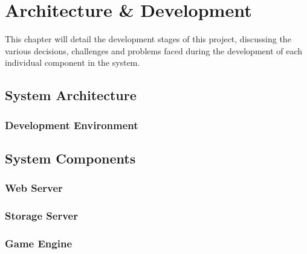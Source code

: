 \chapter{Architecture \& Development}
This chapter will detail the development stages of this project, discussing the various decisions, challenges and problems faced during the development of each individual component in the system.

\section{System Architecture}
	\subsection{Development Environment}


\section{System Components}
% 
	\subsection{Web Server}
	\subsection{Storage Server}

	\subsection{Game Engine}
